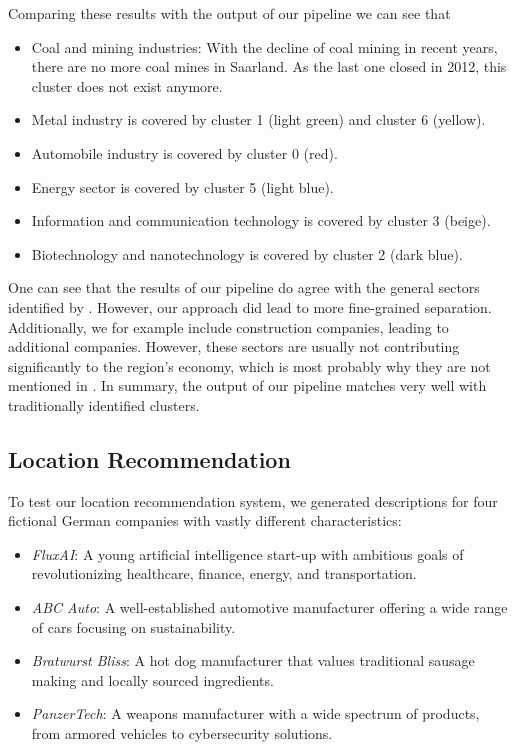 \documentclass[conference]{IEEEtran}
\begin{document}
Comparing these results with the output of our pipeline we can see that 

\begin{itemize}
	\item Coal and mining industries: With the decline of coal mining in recent years, there are no more coal mines in Saarland. As the last one closed in 2012, this cluster does not exist anymore. 
	\item Metal industry is covered by cluster 1 (light green) and cluster 6 (yellow).
	\item Automobile industry is covered by cluster 0 (red).
	\item Energy sector is covered by cluster 5 (light blue).
	\item Information and communication technology is covered by cluster 3 (beige).
	\item Biotechnology and nanotechnology is covered by cluster 2 (dark blue).
\end{itemize}

One can see that the results of our pipeline do agree with the general sectors identified by \cite{saarlandeco2}. However, our approach did lead to more fine-grained separation. Additionally, we for example include construction companies, leading to additional companies. However, these sectors are usually not contributing significantly to the region's economy, which is most probably why they are not mentioned in \cite{saarlandeco2}. In summary, the output of our pipeline matches very well with traditionally identified clusters.

\subsection{Location Recommendation}
To test our location recommendation system, we generated descriptions for four fictional German companies with vastly different characteristics:
\begin{itemize}
    \item \textit{FluxAI}: A young artificial intelligence start-up with ambitious goals of revolutionizing healthcare, finance, energy, and transportation.
    \item \textit{ABC Auto}: A well-established automotive manufacturer offering a wide range of cars focusing on sustainability.
    \item \textit{Bratwurst Bliss}: A hot dog manufacturer that values traditional sausage making and locally sourced ingredients.
    \item \textit{PanzerTech}: A weapons manufacturer with a wide spectrum of products, from armored vehicles to cybersecurity solutions.
\end{itemize}
\end{document}
